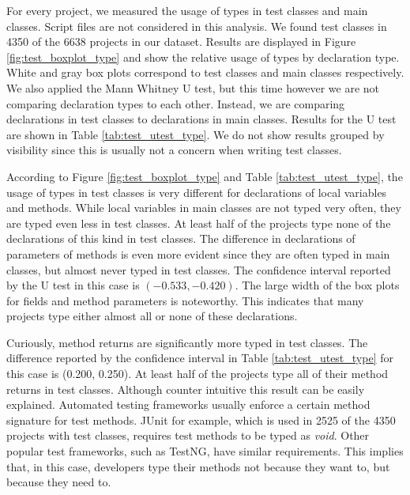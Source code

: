 \documentclass[preprint]{sigplanconf}
\begin{document}
For every project, we measured the usage of types in test classes and main classes.
Script files are not considered in this analysis.
We found test classes in 4350 of the 6638 projects in our dataset.
Results are displayed in Figure \ref{fig:test_boxplot_type} and show the relative usage of types by declaration type.
White and gray box plots correspond to test classes and main classes respectively.
We also applied the Mann Whitney U test, but this time however we are not comparing declaration types to each other.
Instead, we are comparing declarations in test classes to declarations in main classes.
Results for the U test are shown in Table \ref{tab:test_utest_type}.
We do not show results grouped by visibility since this is usually not a concern when writing test classes.

According to Figure \ref{fig:test_boxplot_type} and Table \ref{tab:test_utest_type}, the usage of types in test classes is very different for declarations of local variables and methods.
While local variables in main classes are not typed very often, they are typed even less in test classes.
At least half of the projects type none of the declarations of this kind in test classes.
The difference in declarations of parameters of methods is even more evident since they are often typed in main classes, but almost never typed in test classes.
The confidence interval reported by the U test in this case is $(-0.533, -0.420)$.
The large width of the box plots for fields and method parameters is noteworthy.
This indicates that many projects type either almost all or none of these declarations.

Curiously, method returns are significantly more typed in test classes.
The difference reported by the confidence interval in Table \ref{tab:test_utest_type} for this case is (0.200, 0.250).
At least half of the projects type all of their method returns in test classes.
Although counter intuitive this result can be easily explained.
Automated testing frameworks usually enforce a certain method signature for test methods.
JUnit for example, which is used in 2525 of the 4350 projects with test classes, requires test methods to be typed as \emph{void}.
Other popular test frameworks, such as TestNG, have similar requirements.
This implies that, in this case, developers type their methods not because they want to, but because they need to.
\end{document}
